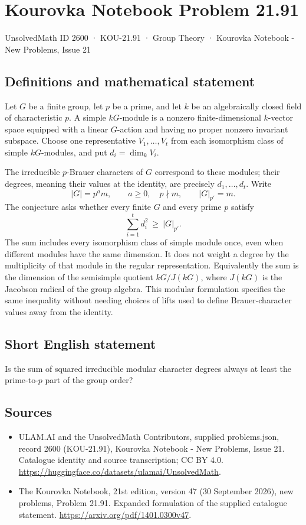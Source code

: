 \documentclass[11pt,a4paper]{article}
\begin{document}
\section*{Kourovka Notebook Problem 21.91}\label{2600}
{\small UnsolvedMath ID 2600 · KOU-21.91 · Group Theory · Kourovka Notebook - New Problems, Issue 21}
\subsection{Definitions and mathematical statement}
Let $G$ be a finite group, let $p$ be a prime, and let $k$ be an algebraically closed field of characteristic $p$. A simple $kG$-module is a nonzero finite-dimensional $k$-vector space equipped with a linear $G$-action and having no proper nonzero invariant subspace. Choose one representative $V_1,\ldots,V_t$ from each isomorphism class of simple $kG$-modules, and put $d_i=\dim_kV_i$.

The irreducible $p$-Brauer characters of $G$ correspond to these modules; their degrees, meaning their values at the identity, are precisely $d_1,\ldots,d_t$. Write
\[
 |G|=p^a m,\qquad a\ge0,\quad p\nmid m,
 \qquad |G|_{p'}=m.
\]
The conjecture asks whether every finite $G$ and every prime $p$ satisfy
\[
 \sum_{i=1}^{t}d_i^2\ \ge\ |G|_{p'}.
\]
The sum includes every isomorphism class of simple module once, even when different modules have the same dimension. It does not weight a degree by the multiplicity of that module in the regular representation. Equivalently the sum is the dimension of the semisimple quotient $kG/J(kG)$, where $J(kG)$ is the Jacobson radical of the group algebra. This modular formulation specifies the same inequality without needing choices of lifts used to define Brauer-character values away from the identity.
\subsection{Short English statement}
Is the sum of squared irreducible modular character degrees always at least the prime-to-$p$ part of the group order?
\subsection{Sources}
\begin{itemize}
\item[S1] ULAM.AI and the UnsolvedMath Contributors, supplied problems.json, record 2600 (KOU-21.91), Kourovka Notebook - New Problems, Issue 21. Catalogue identity and source transcription; CC BY 4.0.
\url{https://huggingface.co/datasets/ulamai/UnsolvedMath}.
\item[S2] The Kourovka Notebook, 21st edition, version 47 (30 September 2026), new problems, Problem 21.91. Expanded formulation of the supplied catalogue statement.
\url{https://arxiv.org/pdf/1401.0300v47}.
\end{itemize}
\end{document}
